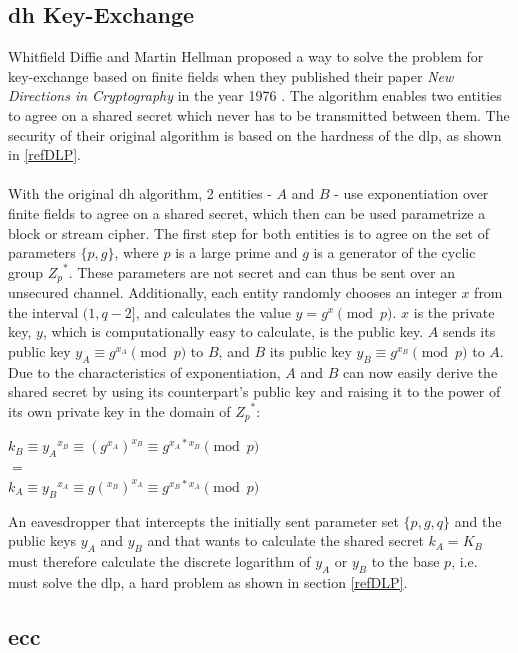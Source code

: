 \subsection{\gls{dh} Key-Exchange}

Whitfield Diffie and Martin Hellman proposed a way to solve the problem for key-exchange based on finite fields
when they published their paper \textit{New Directions in Cryptography} in the year 1976 \cite{1055638}. The algorithm enables two entities to agree on a 
shared secret which never has to be transmitted between them. The security of their original algorithm
is based on the hardness of the \gls{dlp}, as shown in \ref{refDLP}.
\\
\\
With the original \gls{dh} algorithm, 2 entities - $A$ and $B$ - use exponentiation over finite fields to agree on a shared secret, which
then can be used parametrize a block or stream cipher. The first step for both entities is to agree on the set of parameters $\{p, g\}$, where $p$ is a 
large prime and $g$ is a generator of the cyclic group ${Z_p}^*$. These parameters are not secret and
can thus be sent over an unsecured channel.
Additionally, each entity randomly chooses an integer $x$ from the interval $(1, q-2]$, and calculates the value $y = g^x \pmod p$. $x$ is the private key,
$y$, which is computationally easy to calculate, is the public key. $A$ sends its public key $y_A \equiv g^{x_A} \pmod p$ to $B$, and $B$ its public key
$y_B \equiv g^{x_B} \pmod p$ to $A$. Due to the characteristics of exponentiation, $A$ and $B$ can now easily derive the shared secret by using its counterpart's
public key and raising it to the power of its own private key in the domain of ${Z_p}^*$:

\begin{center}
 $k_B \equiv {y_A}^{x_B} \equiv (g^{x_A})^{x_B} \equiv g^{x_A*x_B} \pmod p $\\
 $ = $ \\
 $ k_A \equiv {y_B}^{x_A} \equiv g(^{x_B})^{x_A} \equiv g^{x_B*x_A} \pmod p $
\end{center}
An eavesdropper that intercepts the initially sent parameter set $\{p, g, q\}$ and the public keys $y_A$ and $y_B$ and that wants to calculate the shared secret
$k_A = K_B$  must therefore calculate the discrete logarithm of $y_A$ or $y_B$ to the base $p$, i.e. must solve the \gls{dlp}, a hard problem as shown in
section \ref{refDLP}.
\\

\subsection{\gls{ecc}}

